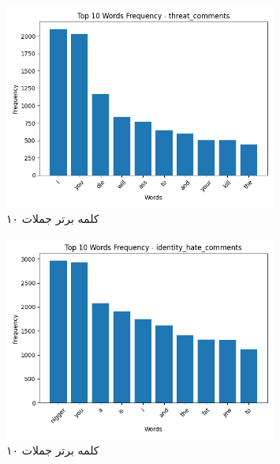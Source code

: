 \begin{figure}
  \centering
  \includegraphics[width=0.8\textwidth]{stats/top_ten_histogram_threat_comments.png}
  \caption{۱۰ کلمه برتر جملات }
  \label{fig:unique_uncommon_words_count}
\end{figure}

\begin{figure}
  \centering
  \includegraphics[width=0.8\textwidth]{stats/top_ten_histogram_identity_hate_comments.png}
  \caption{۱۰ کلمه برتر جملات }
  \label{fig:unique_uncommon_words_count}
\end{figure}

\clearpage

